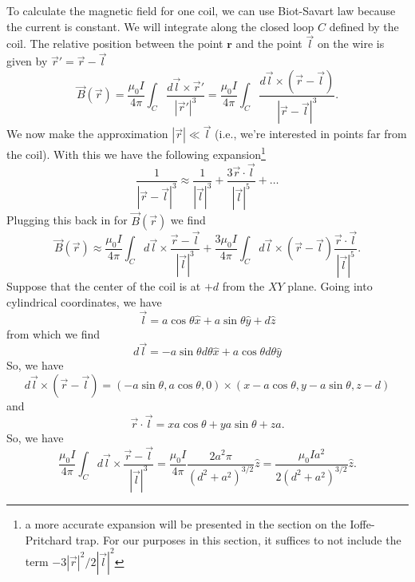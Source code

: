 \documentclass{book}
\theoremstyle{definition}
\newcommand{\f}[2]{\frac{#1}{#2}}
\begin{document}
To calculate the magnetic field for one coil, we can use Biot-Savart law because the current is constant. We will integrate along the closed loop $C$ defined by the coil. The relative position between the point $\mathbf{r}$ and the point $\vec{l}$ on the wire is given by $\vec{r}' = \vec{r} - \vec{l}$
\begin{equation*}
\vec{B}(\vec{r}) = \f{\mu_0 I}{4\pi} \int_C \f{d\vec{l} \times \vec{r}'}{ |{\vec{r}'}|^3} = \f{\mu_0 I}{4\pi} \int_C \f{d\vec{l} \times (\vec{r} - \vec{l})}{|{\vec{r} - \vec{l}}|^3}.  
\end{equation*}
We now make the approximation $|\vec{r}| \ll \vec{l}$ (i.e., we're interested in points far from the coil). With this we have the following expansion\footnote{a more accurate expansion will be presented in the section on the Ioffe-Pritchard trap. For our purposes in this section, it suffices to not include the term $-3|\vec{r}|^2/2|\vec{l}|^2$}
\begin{equation*}
\f{1}{|\vec{r} - \vec{l}|^3} \approx \f{1}{|\vec{l}|^3} + \f{3 \vec{r}\cdot \vec{l}}{|\vec{l}|^5} + \dots
\end{equation*}
Plugging this back in for $\vec{B}(\vec{r})$ we find 
\begin{equation*}
\vec{B}(\vec{r}) \approx \f{\mu_0 I}{4\pi}\int_C d\vec{l}\times \f{\vec{r} - \vec{l}}{|\vec{l}|^3} + \f{3\mu_0 I}{4\pi} \int_C d\vec{l} \times (\vec{r} - \vec{l}) \f{\vec{r}\cdot \vec{l}}{|\vec{l}|^5}.
\end{equation*}
Suppose that the center of the coil is at $+d$ from the $XY$ plane. Going into cylindrical coordinates, we have
\begin{equation*}
\vec{l} = a\cos\theta\hat{x} + a\sin\theta\hat{y} + d\hat{z}
\end{equation*}
from which we find 
\begin{equation*}
d\vec{l} = -a\sin\theta d\theta\hat{x} + a\cos\theta d\theta \hat{y}
\end{equation*}
So, we have
\begin{equation*}
d\vec{l} \times (\vec{r} - \vec{l}) = (-a\sin\theta, a\cos\theta,0)\times(x-a\cos\theta,y-a\sin\theta,z-d)
\end{equation*}
and 
\begin{equation*}
\vec{r}\cdot \vec{l} = xa\cos\theta + ya\sin\theta + za.
\end{equation*}
So, we have
\begin{equation*}
\f{\mu_0 I}{4\pi}\int_C d\vec{l}\times \f{\vec{r} - \vec{l}}{|\vec{l}|^3} = \f{\mu_0 I }{4\pi} \f{2a^2 \pi}{(d^2 + a^2)^{3/2}} \hat{z} = \f{\mu_0 I a^2}{2(d^2 + a^2)^{3/2}} \hat{z}.
\end{equation*}
\end{document}
